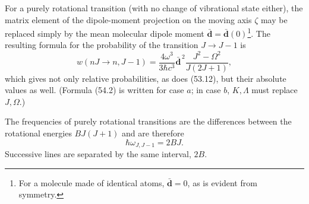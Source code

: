 For a purely rotational transition (with no change of vibrational state either), the matrix element of the dipole-moment projection on the moving axis $\zeta$ may be replaced simply by the mean molecular dipole moment $\bar{\mathbf d}=\bar{\mathbf d}(0)$\footnote{For a molecule made of identical atoms, $\bar{\mathbf d}=0$, as is evident from symmetry.}. The resulting formula for the probability of the transition $J\to J-1$ is
\begin{equation}
w(nJ\to n,J-1)=\frac{4\omega^3}{3\hbar c^3}\bar{\mathbf d}^{\,2}\frac{J^2-\Omega^2}{J(2J+1)},
\tag{54.2}
\end{equation}
which gives not only relative probabilities, as does (53.12), but their absolute values as well. (Formula (54.2) is written for case $a$; in case $b$, $K,\Lambda$ must replace $J,\Omega$.)

The frequencies of purely rotational transitions are the differences between the rotational energies $BJ(J+1)$ and are therefore
\begin{equation}
\hbar\omega_{J,J-1}=2BJ.
\tag{54.3}
\end{equation}
Successive lines are separated by the same interval, $2B$.
